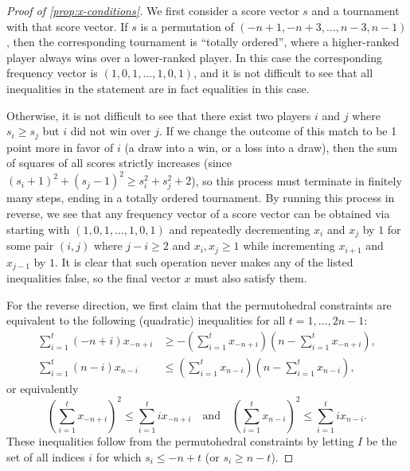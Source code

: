 \documentclass[10pt,a4paper]{amsart}
\begin{document}
\begin{proof}[Proof of \cref{prop:x-conditions}]
    We first consider a score vector $s$ and a tournament with that score vector. If $s$ is a permutation of $(-n+1, -n+3, \dots, n-3, n-1)$, then the corresponding tournament is ``totally ordered'', where a higher-ranked player always wins over a lower-ranked player. In this case the corresponding frequency vector is $(1, 0, 1, \dots, 1, 0, 1)$, and it is not difficult to see that all inequalities in the statement are in fact equalities in this case. 
    
    Otherwise, it is not difficult to see that there exist two players $i$ and $j$ where $s_i \geq s_j$ but $i$ did not win over $j$. If we change the outcome of this match to be 1 point more in favor of $i$ (a draw into a win, or a loss into a draw), then the sum of squares of all scores strictly increases (since $(s_i+1)^2 + (s_j-1)^2 \geq s_i^2 + s_j^2 + 2$), so this process must terminate in finitely many steps, ending in a totally ordered tournament. By running this process in reverse, we see that any frequency vector of a score vector can be obtained via starting with $(1, 0, 1, \dots, 1, 0, 1)$ and repeatedly decrementing $x_i$ and $x_j$ by $1$ for some pair $(i,j)$ where $j - i \geq 2$ and $x_i, x_j\geq 1$ while incrementing $x_{i+1}$ and $x_{j-1}$ by $1$. It is clear that such operation never makes any of the listed inequalities false, so the final vector $x$ must also satisfy them.

    For the reverse direction, we first claim that the permutohedral constraints are equivalent to the following (quadratic) inequalities for all $t = 1, \dots, 2n-1$: \begin{align*}
        \sum_{i=1}^{t}(-n+i)x_{-n+i} &\geq -\left(\sum_{i=1}^{t}x_{-n+i}\right)\left(n-\sum_{i=1}^{t}x_{-n+i}\right), \\
        \sum_{i=1}^{t}(n-i)x_{n-i} &\leq \left(\sum_{i=1}^{t}x_{n-i}\right)\left(n-\sum_{i=1}^{t}x_{n-i}\right),
    \end{align*}
    or equivalently 
    \begin{equation}\label{eq2}
        \left(\sum_{i=1}^{t}x_{-n+i}\right)^2 \leq \sum_{i=1}^t ix_{-n+i}\quad \text{and}\quad \left(\sum_{i=1}^{t}x_{n-i}\right)^2 \leq \sum_{i=1}^t ix_{n-i}.
    \end{equation}
    These inequalities follow from the permutohedral constraints by letting $I$ be the set of all indices $i$ for which $s_i\leq -n+t$ (or $s_i\geq n-t$). 
    

\end{proof}
\end{document}
